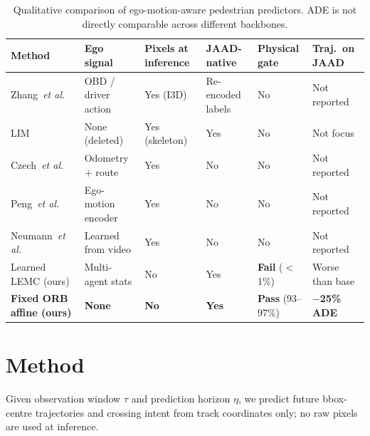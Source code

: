\documentclass[conference]{IEEEtran}
\begin{document}
\begin{table}[!t]
\centering
\caption{Qualitative comparison of ego-motion-aware pedestrian predictors. ADE is not directly comparable across different backbones.}
\label{tab:compare}
\footnotesize
\setlength{\tabcolsep}{4pt}
\begin{tabularx}{\textwidth}{@{}l*{5}{>{\centering\arraybackslash}X}@{}}
\toprule
Method & Ego signal & Pixels at inference & JAAD-native & Physical gate & Traj.\ on JAAD \\
\midrule
Zhang~\textit{et al.}~\cite{zhang2024decouple} & OBD / driver action & Yes (I3D) & Re-encoded labels & No & Not reported \\
LIM~\cite{lim2025tits} & None (deleted) & Yes (skeleton) & Yes & No & Not focus \\
Czech~\textit{et al.}~\cite{czech2023behavior} & Odometry + route & Yes & No & No & Not reported \\
Peng~\textit{et al.}~\cite{peng2026trajmamba} & Ego-motion encoder & Yes & No & No & Not reported \\
Neumann~\textit{et al.}~\cite{neumann2021pedestrian} & Learned from video & Yes & No & No & Not reported \\
Learned LEMC (ours) & Multi-agent stats & No & Yes & \textbf{Fail} ($<$1\%) & Worse than base \\
\textbf{Fixed ORB affine (ours)} & \textbf{None} & \textbf{No} & \textbf{Yes} & \textbf{Pass} (93--97\%) & \textbf{$-$25\% ADE} \\
\bottomrule
\end{tabularx}
\end{table}

\FloatBarrier

\section{Method}
\label{sec:method}

Given observation window $\tau$ and prediction horizon $\eta$, we predict future bbox-centre trajectories and crossing intent from track coordinates only; no raw pixels are used at inference.
\end{document}
